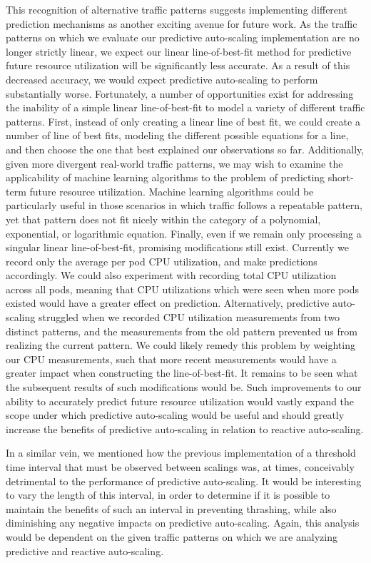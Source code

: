 This recognition of alternative traffic patterns suggests implementing
different prediction mechanisms as another exciting avenue for future work. As
the traffic patterns on which we evaluate our predictive auto-scaling
implementation are no longer strictly linear, we expect our linear
line-of-best-fit method for predictive future resource utilization will be
significantly less accurate. As a result of this decreased accuracy, we would
expect predictive auto-scaling to perform substantially worse. Fortunately, a
number of opportunities exist for addressing the inability of a simple linear
line-of-best-fit to model a variety of different traffic patterns.
First, instead of only creating a linear line of best fit, we could
create a number of line of best fits, modeling the different possible equations
for a line, and then choose the one that best explained our observations so far.
Additionally, given more divergent real-world traffic patterns, we may wish to
examine the applicability of machine learning algorithms to the problem of
predicting short-term future resource utilization. Machine learning algorithms could be
particularly useful in those scenarios in which traffic follows a repeatable
pattern, yet that pattern does not fit nicely within the category of a
polynomial, exponential, or logarithmic equation. Finally, even if we remain
only processing a singular linear line-of-best-fit, promising modifications
still exist. Currently we record only the
average per pod CPU utilization, and make predictions accordingly. We could also
experiment with recording total CPU utilization across all pods, meaning
that CPU utilizations which were seen when more pods existed would have a
greater effect on prediction. Alternatively, predictive auto-scaling struggled
when we recorded CPU utilization measurements from two distinct patterns, and
the measurements from the old pattern prevented us from realizing the current
pattern. We could likely remedy this problem by weighting our CPU measurements,
such that more recent measurements would have a greater impact when constructing the
line-of-best-fit. It remains to be seen what the subsequent results
of such modifications would be. Such improvements to our
ability to accurately predict future resource utilization
would vastly expand the scope under which predictive auto-scaling would be
useful and should greatly increase the benefits of predictive auto-scaling in
relation to reactive auto-scaling.

In a similar vein, we mentioned how the previous implementation of a threshold time
interval that must be observed between scalings was, at times, conceivably
detrimental to the performance of predictive auto-scaling.
It would be interesting to vary the length of this interval, in
order to determine if it is possible to maintain the benefits of such an
interval in preventing
thrashing, while also diminishing any negative impacts on predictive
auto-scaling. Again, this analysis would be dependent on the given traffic
patterns on which we are analyzing predictive and reactive auto-scaling.


